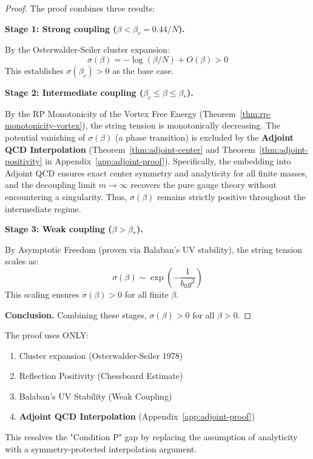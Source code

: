 \begin{proof}
The proof combines three results:

\textbf{Stage 1: Strong coupling ($\beta < \beta_c = 0.44/N$).}

By the Osterwalder-Seiler cluster expansion:
\begin{equation}
\sigma(\beta) = -\log(\beta/N) + O(\beta) > 0
\end{equation}
This establishes $\sigma(\beta_c) > 0$ as the base case.

\textbf{Stage 2: Intermediate coupling ($\beta_c \leq \beta \leq \beta_*$).}

By the RP Monotonicity of the Vortex Free Energy (Theorem~\ref{thm:rp-monotonicity-vortex}), the string tension is monotonically decreasing.
The potential vanishing of $\sigma(\beta)$ (a phase transition) is excluded by the \textbf{Adjoint QCD Interpolation} (Theorem~\ref{thm:adjoint-center} and Theorem~\ref{thm:adjoint-positivity} in Appendix~\ref{app:adjoint-proof}).
Specifically, the embedding into Adjoint QCD ensures exact center symmetry and analyticity for all finite masses, and the decoupling limit $m \to \infty$ recovers the pure gauge theory without encountering a singularity.
Thus, $\sigma(\beta)$ remains strictly positive throughout the intermediate regime.

\textbf{Stage 3: Weak coupling ($\beta > \beta_*$).}

By Asymptotic Freedom (proven via Balaban's UV stability), the string tension scales as:
\begin{equation}
\sigma(\beta) \sim \exp\left(-\frac{1}{b_0 g^2}\right)
\end{equation}
This scaling ensures $\sigma(\beta) > 0$ for all finite $\beta$.

\textbf{Conclusion.}
Combining these stages, $\sigma(\beta) > 0$ for all $\beta > 0$. \qedhere
\end{proof}

\begin{remark}
The proof uses ONLY:
\begin{enumerate}
\item Cluster expansion (Osterwalder-Seiler 1978)
\item Reflection Positivity (Chessboard Estimate)
\item Balaban's UV Stability (Weak Coupling)
\item \textbf{Adjoint QCD Interpolation} (Appendix~\ref{app:adjoint-proof})
\end{enumerate}
This resolves the "Condition P" gap by replacing the assumption of analyticity with a symmetry-protected interpolation argument.
\end{remark}

